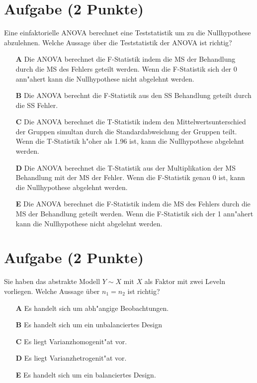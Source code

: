 \documentclass[a4paper, 10pt]{scrartcl}\usepackage[]{graphicx}\usepackage[]{xcolor}
\begin{document}
\section{Aufgabe \hfill (2 Punkte)}

Eine einfaktorielle ANOVA berechnet eine Teststatistik um zu die Nullhypothese abzulehnen. Welche Aussage {\"u}ber die Teststatistik der ANOVA ist richtig?



\begin{enumerate}
\item [\textbf{A} \msquare] Die ANOVA berechnet die F-Statistik indem die MS der Behandlung durch die MS des Fehlers geteilt werden. Wenn die F-Statistik sich der 0 ann{"a}hert kann die Nullhypothese nicht abgelehnt werden.
\item [\textbf{B} \msquare] Die ANOVA berechnt die F-Statistik aus den SS Behandlung geteilt durch die SS Fehler.
\item [\textbf{C} \msquare] Die ANOVA berechnet die T-Statistik indem den Mittelwertsunterschied der Gruppen simultan durch die Standardabweichung der Gruppen teilt. Wenn die T-Statistik h{"o}her als 1.96 ist, kann die Nullhypothese abgelehnt werden.
\item [\textbf{D} \msquare] Die ANOVA berechnet die T-Statistik aus der Multiplikation der MS Behandlung mit der MS der Fehler. Wenn die F-Statistik genau 0 ist, kann die Nullhypothese abgelehnt werden.
\item [\textbf{E} \msquare] Die ANOVA berechnet die F-Statistik indem die MS des Fehlers durch die MS der Behandlung geteilt werden. Wenn die F-Statistik sich der 1 ann{"a}hert kann die Nullhypothese nicht abgelehnt werden.
\end{enumerate} 

\section{Aufgabe \hfill (2 Punkte)}




Sie haben das abstrakte Modell $Y \sim X$ mit $X$ als Faktor mit zwei
Leveln vorliegen. Welche Aussage {\"u}ber $n_1 = n_2$ ist richtig?



\begin{enumerate}
\item [\textbf{A} \msquare] Es handelt sich um abh{"a}ngige Beobachtungen.
\item [\textbf{B} \msquare] Es handelt sich um ein unbalanciertes Design
\item [\textbf{C} \msquare] Es liegt Varianzhomogenit{"a}t vor.
\item [\textbf{D} \msquare] Es liegt Varianzhetrogenit{"a}t vor.
\item [\textbf{E} \msquare] Es handelt sich um ein balanciertes Design.
\end{enumerate} 
\end{document}
